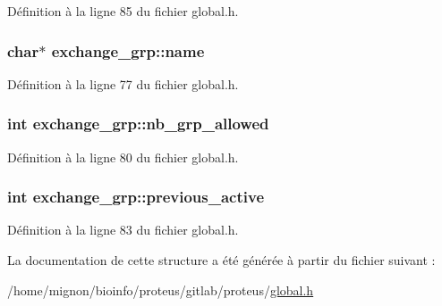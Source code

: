 Définition à la ligne 85 du fichier global.\+h.

\hypertarget{structexchange__grp_a3155a188779bf7782502eb4fcb994852}{
\subsubsection[{name}]{\setlength{\rightskip}{0pt plus 5cm}char$\ast$ exchange\+\_\+grp\+::name}}\label{structexchange__grp_a3155a188779bf7782502eb4fcb994852}


Définition à la ligne 77 du fichier global.\+h.

\hypertarget{structexchange__grp_af4c233bea11eb951a4b606ca434b553d}{
\subsubsection[{nb\+\_\+grp\+\_\+allowed}]{\setlength{\rightskip}{0pt plus 5cm}int exchange\+\_\+grp\+::nb\+\_\+grp\+\_\+allowed}}\label{structexchange__grp_af4c233bea11eb951a4b606ca434b553d}


Définition à la ligne 80 du fichier global.\+h.

\hypertarget{structexchange__grp_a3493a6f5ca916f85526f87575e6d1c86}{
\subsubsection[{previous\+\_\+active}]{\setlength{\rightskip}{0pt plus 5cm}int exchange\+\_\+grp\+::previous\+\_\+active}}\label{structexchange__grp_a3493a6f5ca916f85526f87575e6d1c86}


Définition à la ligne 83 du fichier global.\+h.



La documentation de cette structure a été générée à partir du fichier suivant \+:\begin{DoxyCompactItemize}
\item 
/home/mignon/bioinfo/proteus/gitlab/proteus/\hyperlink{global_8h}{global.\+h}\end{DoxyCompactItemize}
